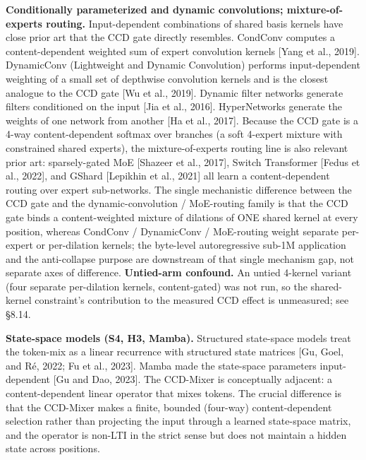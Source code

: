 \documentclass[11pt]{article}
\begin{document}
\textbf{Conditionally parameterized and dynamic convolutions; mixture-of-experts routing.} Input-dependent combinations of shared basis kernels have close prior art that the CCD gate directly resembles. CondConv computes a content-dependent weighted sum of expert convolution kernels [Yang et al., 2019]. DynamicConv (Lightweight and Dynamic Convolution) performs input-dependent weighting of a small set of depthwise convolution kernels and is the closest analogue to the CCD gate [Wu et al., 2019]. Dynamic filter networks generate filters conditioned on the input [Jia et al., 2016]. HyperNetworks generate the weights of one network from another [Ha et al., 2017]. Because the CCD gate is a 4-way content-dependent softmax over branches (a soft 4-expert mixture with constrained shared experts), the mixture-of-experts routing line is also relevant prior art: sparsely-gated MoE [Shazeer et al., 2017], Switch Transformer [Fedus et al., 2022], and GShard [Lepikhin et al., 2021] all learn a content-dependent routing over expert sub-networks. The single mechanistic difference between the CCD gate and the dynamic-convolution / MoE-routing family is that the CCD gate binds a content-weighted mixture of dilations of ONE shared kernel at every position, whereas CondConv / DynamicConv / MoE-routing weight separate per-expert or per-dilation kernels; the byte-level autoregressive sub-1M application and the anti-collapse purpose are downstream of that single mechanism gap, not separate axes of difference. \textbf{Untied-arm confound.} An untied 4-kernel variant (four separate per-dilation kernels, content-gated) was not run, so the shared-kernel constraint's contribution to the measured CCD effect is unmeasured; see \S8.14.

\textbf{State-space models (S4, H3, Mamba).} Structured state-space models treat the token-mix as a linear recurrence with structured state matrices [Gu, Goel, and R\'e, 2022; Fu et al., 2023]. Mamba made the state-space parameters input-dependent [Gu and Dao, 2023]. The CCD-Mixer is conceptually adjacent: a content-dependent linear operator that mixes tokens. The crucial difference is that the CCD-Mixer makes a finite, bounded (four-way) content-dependent selection rather than projecting the input through a learned state-space matrix, and the operator is non-LTI in the strict sense but does not maintain a hidden state across positions.
\end{document}
